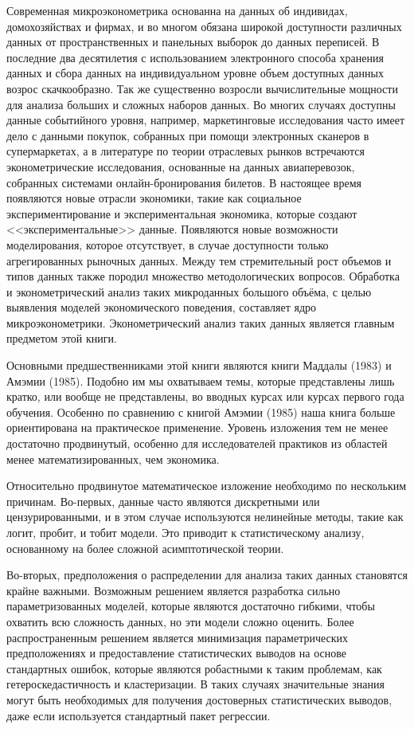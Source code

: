 Современная  микроэконометрика основанна на данных об индивидах, домохозяйствах и фирмах, и во многом  обязана широкой доступности различных данных от пространственных и панельных выборок до данных переписей. В последние два десятилетия с использованием электронного способа хранения данных  и сбора данных на индивидуальном уровне объем доступных данных возрос скачкообразно. 
Так же существенно возросли вычислительные мощности для анализа больших и сложных наборов данных. 
Во многих случаях доступны данные событийного уровня, например, маркетинговые исследования часто имеет дело с данными покупок, собранных при помощи электронных сканеров в супермаркетах, а в литературе по теории отраслевых рынков встречаются эконометрические исследования, основанные на данных авиаперевозок, собранных системами онлайн-бронирования билетов. В настоящее время появляются новые отрасли экономики, такие как социальное экспериментирование и  экспериментальная экономика, которые создают <<экспериментальные>> данные. Появляются новые возможности моделирования, которое отсутствует, в случае доступности только агрегированных рыночных данных. Между тем стремительный рост объемов и типов данных также породил множество методологических вопросов. Обработка и эконометрический анализ таких  микроданных большого объёма, с целью выявления моделей экономического поведения, составляет ядро микроэконометрики. Эконометрический анализ таких данных является главным предметом этой книги.
	
	
Основными предшественниками этой книги являются книги Маддалы (1983) и Амэмии (1985). Подобно им мы охватываем темы, которые представлены лишь кратко, или вообще не представлены, во вводных курсах или курсах первого года обучения. Особенно по сравнению с книгой Амэмии (1985) наша книга больше ориентирована на практическое применение. Уровень изложения тем не менее достаточно продвинутый, особенно для исследователей практиков из областей менее математизированных, чем экономика.
	
	
Относительно продвинутое математическое изложение  необходимо по нескольким причинам. Во-первых, данные часто являются дискретными или цензурированными, и в этом случае используются нелинейные методы, такие как логит, пробит, и тобит модели. Это приводит к статистическому анализу, основанному на более сложной асимптотической теории.
	
	
Во-вторых, предположения о распределении для анализа таких данных становятся крайне важными. Возможным решением является разработка сильно параметризованных моделей, которые являются достаточно гибкими, чтобы охватить всю сложность данных, но эти модели сложно оценить. Более распространенным решением является минимизация параметрических предположениях и предоставление статистических выводов на основе стандартных ошибок, которые являются робастными к таким проблемам, как гетероскедастичность и кластеризации. В таких случаях значительные знания могут быть необходимых для получения достоверных статистических выводов, даже если используется стандартный пакет регрессии.
	
